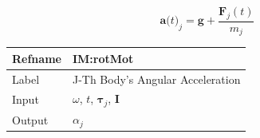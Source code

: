 \documentclass[12pt]{article}
\begin{document}
\begin{displaymath}
{\symbf{a}\text{(}t\text{)}_{j}}=\symbf{g}+\frac{{\symbf{F}_{j}}\left(t\right)}{{m_{j}}}
\end{displaymath}
\medskip
\noindent
\begin{minipage}{\textwidth}
\begin{tabular}{>{\raggedright}p{}>{\raggedright\arraybackslash}p{}}
\toprule \textbf{Refname} & \textbf{IM:rotMot}
\label{IM:rotMot}
\\ \midrule
Label & J-Th Body's Angular Acceleration
        
\\ \midrule
Input & $ω$, $t$, ${\symbf{τ}_{j}}$, $\symbf{I}$
        
\\ \midrule
Output & ${α_{j}}$
         

\end{tabular}
\end{minipage}
\end{document}
